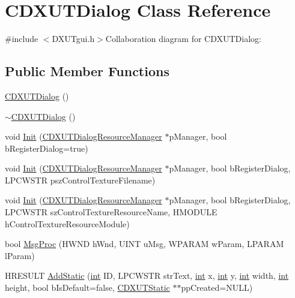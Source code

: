\hypertarget{class_c_d_x_u_t_dialog}{
\section{CDXUTDialog Class Reference}
\label{class_c_d_x_u_t_dialog}
}


{\ttfamily \#include $<$DXUTgui.h$>$}Collaboration diagram for CDXUTDialog:\subsection*{Public Member Functions}
\begin{DoxyCompactItemize}
\item 
\hyperlink{class_c_d_x_u_t_dialog_ad1d01416a8d21047d45c2ac9253933f9}{CDXUTDialog} ()
\item 
\hyperlink{class_c_d_x_u_t_dialog_ab92a5be82801a2ea84538428ef1edc81}{$\sim$CDXUTDialog} ()
\item 
void \hyperlink{class_c_d_x_u_t_dialog_a45fcf9a802d8a9f1bce9bded09c58e22}{Init} (\hyperlink{class_c_d_x_u_t_dialog_resource_manager}{CDXUTDialogResourceManager} $\ast$pManager, bool bRegisterDialog=true)
\item 
void \hyperlink{class_c_d_x_u_t_dialog_a50607e82b3211003dfaf0daf79aa0719}{Init} (\hyperlink{class_c_d_x_u_t_dialog_resource_manager}{CDXUTDialogResourceManager} $\ast$pManager, bool bRegisterDialog, LPCWSTR pszControlTextureFilename)
\item 
void \hyperlink{class_c_d_x_u_t_dialog_aa1de5939c452894caa2602505aa77e72}{Init} (\hyperlink{class_c_d_x_u_t_dialog_resource_manager}{CDXUTDialogResourceManager} $\ast$pManager, bool bRegisterDialog, LPCWSTR szControlTextureResourceName, HMODULE hControlTextureResourceModule)
\item 
bool \hyperlink{class_c_d_x_u_t_dialog_abb1e03c6d2da865384e34a6a60a41be4}{MsgProc} (HWND hWnd, UINT uMsg, WPARAM wParam, LPARAM lParam)
\item 
HRESULT \hyperlink{class_c_d_x_u_t_dialog_afe893ab17f6905d1908e6fd1499749b1}{AddStatic} (\hyperlink{_d_x_u_tgui_8cpp_a2d77ed03302b6978834ee3b6f57837fb}{int} ID, LPCWSTR strText, \hyperlink{_d_x_u_tgui_8cpp_a2d77ed03302b6978834ee3b6f57837fb}{int} x, \hyperlink{_d_x_u_tgui_8cpp_a2d77ed03302b6978834ee3b6f57837fb}{int} y, \hyperlink{_d_x_u_tgui_8cpp_a2d77ed03302b6978834ee3b6f57837fb}{int} width, \hyperlink{_d_x_u_tgui_8cpp_a2d77ed03302b6978834ee3b6f57837fb}{int} height, bool bIsDefault=false, \hyperlink{class_c_d_x_u_t_static}{CDXUTStatic} $\ast$$\ast$ppCreated=NULL)
$$
\end{DoxyCompactItemize}
